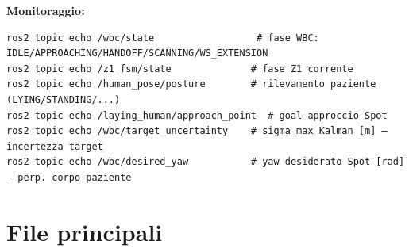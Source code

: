 \documentclass[a4paper,11pt]{article}
\begin{document}
\textbf{Monitoraggio:}
\begin{lstlisting}
ros2 topic echo /wbc/state                  # fase WBC: IDLE/APPROACHING/HANDOFF/SCANNING/WS_EXTENSION
ros2 topic echo /z1_fsm/state              # fase Z1 corrente
ros2 topic echo /human_pose/posture        # rilevamento paziente (LYING/STANDING/...)
ros2 topic echo /laying_human/approach_point  # goal approccio Spot
ros2 topic echo /wbc/target_uncertainty    # sigma_max Kalman [m] — incertezza target
ros2 topic echo /wbc/desired_yaw           # yaw desiderato Spot [rad] — perp. corpo paziente
\end{lstlisting}

\section{File principali}
\end{document}
